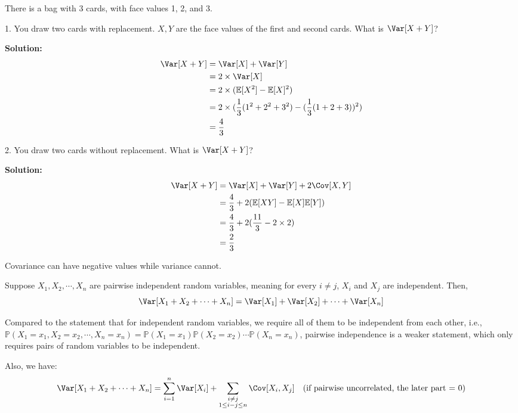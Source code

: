 \begin{eg}
    There is a bag with 3 cards, with face values 1, 2, and 3.
    
    1. You draw two cards with replacement. \(X, Y\) are the face values of the first and second cards. What is \(\Var[X + Y]\)?

    \textbf{Solution:} 
    \[
    \begin{aligned}
        \Var[X + Y] &= \Var[X] + \Var[Y] \\
        &= 2 \times \Var[X] \\
        &= 2 \times (\mathbb{E}[X^2] - \mathbb{E}[X]^2) \\
        &= 2 \times (\dfrac{1}{3}(1^2 + 2^2 + 3^2) - (\dfrac{1}{3}(1 + 2 + 3))^2) \\
        &= \dfrac{4}{3}
    \end{aligned}
    \]

    2. You draw two cards without replacement. What is \(\Var[X + Y]\)?

    \textbf{Solution:} 
    \[
        \begin{aligned}
            \Var[X + Y] &= \Var[X] + \Var[Y] + 2\Cov[X, Y] \\
            &= \dfrac{4}{3} + 2(\mathbb{E}[XY] - \mathbb{E}[X]\mathbb{E}[Y]) \\
            &= \dfrac{4}{3} + 2(\dfrac{11}{3} - 2 \times 2) \\
            &= \dfrac{2}{3}
        \end{aligned}
    \]

    \begin{remark}
        Covariance can have negative values while variance cannot.
    \end{remark}
\end{eg}

Suppose \(X_1, X_2, \cdots, X_n\) are pairwise independent random variables, meaning for every \(i \neq j\), \(X_i\) and \(X_j\) are independent. Then,
\[
    \Var[X_1 + X_2 + \cdots + X_n] = \Var[X_1] + \Var[X_2] + \cdots + \Var[X_n]
\]

Compared to the statement that for independent random variables, we require all of them to be independent from each other, i.e., \(\mathbb{P}(X_1 = x_1, X_2 = x_2, \cdots, X_n = x_n) = \mathbb{P}(X_1 = x_1)\mathbb{P}(X_2 = x_2) \cdots \mathbb{P}(X_n = x_n)\), pairwise independence is a weaker statement, which only requires pairs of random variables to be independent.

Also, we have: 
\[
    \Var[X_1 + X_2 + \cdots + X_n] = \sum_{i = 1}^n \Var[X_i] + \sum_{\substack{i \neq j \\ 1 \leq  i - j \leq n}}\Cov[X_i, X_j] \quad (\text{if pairwise uncorrelated, the later part = 0})
\]

